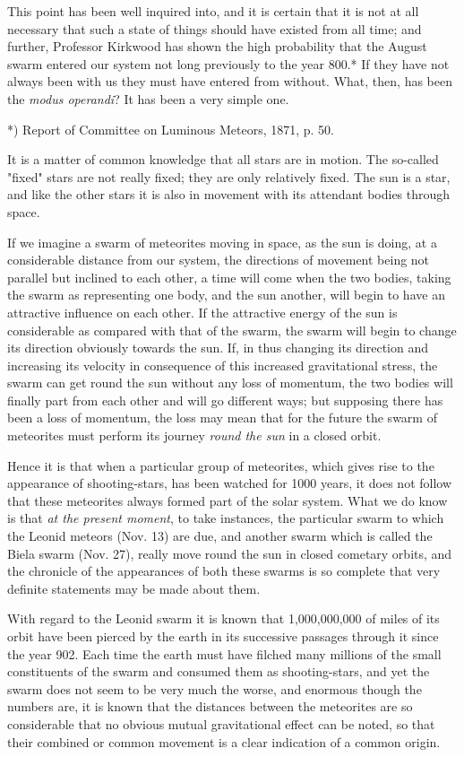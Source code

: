 \documentclass[a4paper, 12pt, oneside, polutonikogreek, english]{article}
\begin{document}
This point has been well inquired into, and it is certain that it is not at all necessary that such a state of things should have existed from all time; and further, Professor Kirkwood has shown the high probability that the August swarm entered our system not long previously to the year 800.* If they have not always been with us they must have entered from without. What, then, has been the \emph{modus operandi}? It has been a very simple one.

*) Report of Committee on Luminous Meteors, 1871, p. 50.

It is a matter of common knowledge that all stars are in motion. The so-called "fixed" stars are not really fixed; they are only relatively fixed. The sun is a star, and like the other stars it is also in movement with its attendant bodies through space.

If we imagine a swarm of meteorites moving in space, as the sun is doing, at a considerable distance from our system, the directions of movement being not parallel but inclined to each other, a time will come when the two bodies, taking the swarm as representing one body, and the sun another, will begin to have an attractive influence on each other. If the attractive energy of the sun is considerable as compared with that of the swarm, the swarm will begin to change its direction obviously towards the sun. If, in thus changing its direction and increasing its velocity in consequence of this increased gravitational stress, the swarm can get round the sun without any loss of momentum, the two bodies will finally part from each other and will go different ways; but supposing there has been a loss of momentum, the loss may mean that for the future the swarm of meteorites must perform its journey \emph{round the sun} in a closed orbit.

Hence it is that when a particular group of meteorites, which gives rise to the appearance of shooting-stars, has been watched for 1000 years, it does not follow that these meteorites always formed part of the solar system. What we do know is that \emph{at the present moment}, to take instances, the particular swarm to which the Leonid meteors (Nov. 13) are due, and another swarm which is called the Biela swarm (Nov. 27), really move round the sun in closed cometary orbits, and the chronicle of the appearances of both these swarms is so complete that very definite statements may be made about them.

With regard to the Leonid swarm it is known that 1,000,000,000 of miles of its orbit have been pierced by the earth in its successive passages through it since the year 902. Each time the earth must have filched many millions of the small constituents of the swarm and consumed them as shooting-stars, and yet the swarm does not seem to be very much the worse, and enormous though the numbers are, it is known that the distances between the meteorites are so considerable that no obvious mutual gravitational effect can be noted, so that their combined or common movement is a clear indication of a common origin.
\end{document}
